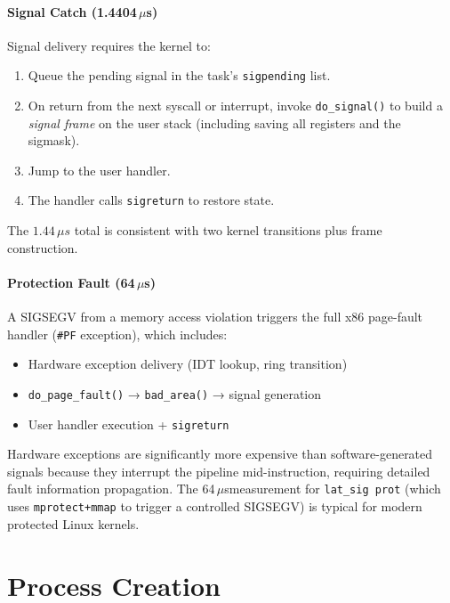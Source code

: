 \documentclass[12pt,a4paper]{article}
\newcommand{\us}{$\mu$s}
\begin{document}
\paragraph{Signal Catch (1.4404\,\us)}
Signal delivery requires the kernel to:
\begin{enumerate}[noitemsep, label=\arabic*.]
    \item Queue the pending signal in the task's \texttt{sigpending} list.
    \item On return from the next syscall or interrupt, invoke
    \texttt{do\_signal()} to build a \textit{signal frame} on the user stack
    (including saving all registers and the sigmask).
    \item Jump to the user handler.
    \item The handler calls \texttt{sigreturn} to restore state.
\end{enumerate}
The $1.44\,\mu s$ total is consistent with two kernel transitions plus frame
construction.

\paragraph{Protection Fault (64\,\us)}
A SIGSEGV from a memory access violation triggers the full x86 page-fault
handler (\texttt{\#PF} exception), which includes:
\begin{itemize}[noitemsep]
    \item Hardware exception delivery (IDT lookup, ring transition)
    \item \texttt{do\_page\_fault()} → \texttt{bad\_area()} → signal generation
    \item User handler execution + \texttt{sigreturn}
\end{itemize}
Hardware exceptions are significantly more expensive than software-generated
signals because they interrupt the pipeline mid-instruction, requiring
detailed fault information propagation. The 64\,\us measurement for
\texttt{lat\_sig prot} (which uses \texttt{mprotect+mmap} to trigger a
controlled SIGSEGV) is typical for modern protected Linux kernels.

\section{Process Creation}
\label{sec:process}
\end{document}

